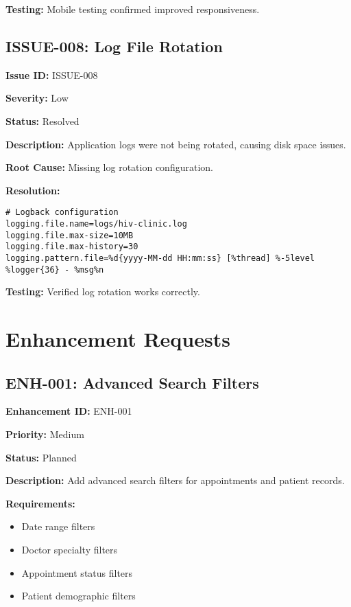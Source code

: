 \documentclass[12pt,a4paper]{article}
\begin{document}
\textbf{Testing:} Mobile testing confirmed improved responsiveness.

\subsection{ISSUE-008: Log File Rotation}

\textbf{Issue ID:} ISSUE-008

\textbf{Severity:} Low

\textbf{Status:} Resolved

\textbf{Description:} Application logs were not being rotated, causing disk space issues.

\textbf{Root Cause:} Missing log rotation configuration.

\textbf{Resolution:}
\begin{lstlisting}[language=properties, caption=Log Rotation Configuration]
# Logback configuration
logging.file.name=logs/hiv-clinic.log
logging.file.max-size=10MB
logging.file.max-history=30
logging.pattern.file=%d{yyyy-MM-dd HH:mm:ss} [%thread] %-5level %logger{36} - %msg%n
\end{lstlisting}

\textbf{Testing:} Verified log rotation works correctly.

\section{Enhancement Requests}

\subsection{ENH-001: Advanced Search Filters}

\textbf{Enhancement ID:} ENH-001

\textbf{Priority:} Medium

\textbf{Status:} Planned

\textbf{Description:} Add advanced search filters for appointments and patient records.

\textbf{Requirements:}
\begin{itemize}
    \item Date range filters
    \item Doctor specialty filters
    \item Appointment status filters
    \item Patient demographic filters
\end{itemize}
\end{document}
